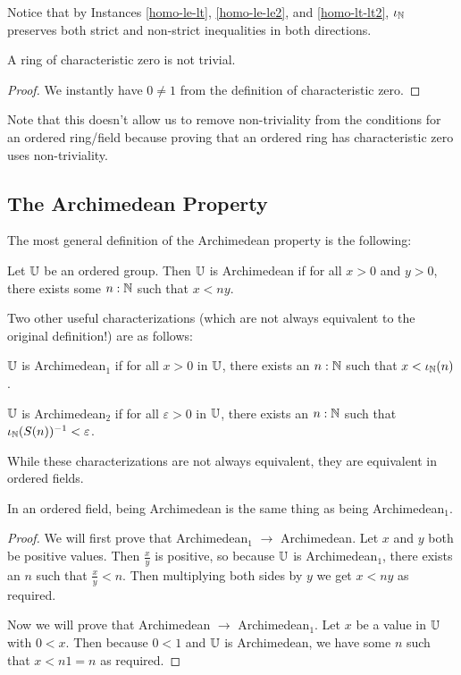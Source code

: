 \documentclass[../math.tex]{subfiles}
\begin{document}
Notice that by Instances \ref{homo-le-lt}, \ref{homo-le-le2}, and
\ref{homo-lt-lt2}, $\iota_{\mathbb{N}}$ preserves both strict and non-strict inequalities in
both directions.

\begin{instance}
    A ring of characteristic zero is not trivial.
\end{instance}
\begin{proof}
    We instantly have $0 \neq 1$ from the definition of characteristic zero.
\end{proof}
\noindent Note that this doesn't allow us to remove non-triviality from the
conditions for an ordered ring/field because proving that an ordered ring has
characteristic zero uses non-triviality.

\subsection{The Archimedean Property}

The most general definition of the Archimedean property is the following:

\begin{class}
    Let $\mathbb{U}$ be an ordered group.  Then $\mathbb{U}$ is Archimedean if for all $x > 0$
    and $y > 0$, there exists some $n : \mathbb{N}$ such that $x < ny$.
\end{class}

Two other useful characterizations (which are not always equivalent to the
original definition!) are as follows:

\begin{definition}
    $\mathbb{U}$ is Archimedean$_1$ if for all $x > 0$ in $\mathbb{U}$, there exists an $n : \mathbb{N}$
    such that $x < \iota_{\mathbb{N}}(n)$.
\end{definition}

\begin{definition}
    $\mathbb{U}$ is Archimedean$_2$ if for all $\varepsilon > 0$ in $\mathbb{U}$, there exists
    an $n : \mathbb{N}$ such that $\iota_{\mathbb{N}}(S(n))^{-1} < \varepsilon$.
\end{definition}

While these characterizations are not always equivalent, they are equivalent in
ordered fields.

\begin{theorem}
    In an ordered field, being Archimedean is the same thing as being
    Archimedean$_1$.
\end{theorem}
\begin{proof}
    We will first prove that Archimedean$_1$ $\rightarrow$ Archimedean.  Let $x$
    and $y$ both be positive values.  Then $\frac{x}{y}$ is positive, so because
    $\mathbb{U}$ is Archimedean$_1$, there exists an $n$ such that $\frac{x}{y} < n$.
    Then multiplying both sides by $y$ we get $x < ny$ as required.

    Now we will prove that Archimedean $\rightarrow$ Archimedean$_1$.  Let $x$
    be a value in $\mathbb{U}$ with $0 < x$.  Then because $0 < 1$ and $\mathbb{U}$ is
    Archimedean, we have some $n$ such that $x < n1 = n$ as required.
\end{proof}
\end{document}
